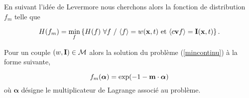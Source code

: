 En suivant l'idée de Levermore nous cherchons alors la fonction de distribution
$f_m$ telle que

\begin{equation}
  \label{mincontinu}
  H(f_m) = \min_f \left\{ H(f) \ \forall f \ / \ \langle f \rangle = w(\mathbf{x},t)
  \mbox{ et } \langle c\mathbf{v} f \rangle =  \mathbf{I}(\mathbf{x},t) \right\}.
\end{equation}

\begin{proposition}
  Pour un couple $(w,\mathbf{I}) \in \mathcal{M}$ alors la solution du problème 
  (\ref{mincontinu}) à la forme suivante,

  \begin{equation}
    f_m(\bm{\alpha}) =  \exp(- 1 -  \mathbf{m} \cdot \bm{\alpha} )
  \end{equation}
  où $\bm{\alpha}$ désigne le multiplicateur de Lagrange associé au problème.
\end{proposition}

